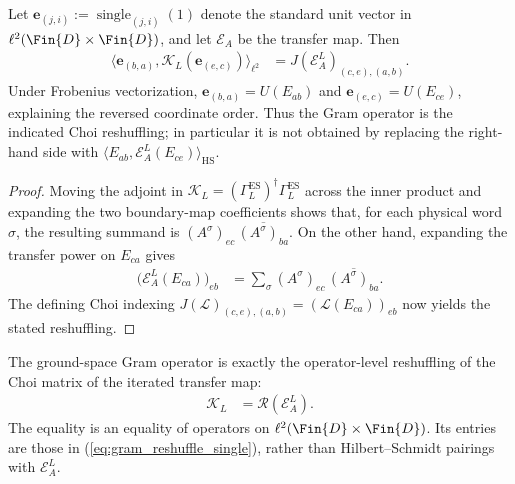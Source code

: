 \begin{lemma}
    \label{thm:ground_space_gram_choi_reshuffling}
    \leanok
    Let $\mathbf e_{(j,i)}:=\operatorname{single}_{(j,i)}(1)$ denote the
    standard unit vector in $\ell^2(\Fin{D}\times\Fin{D})$, and let
    $\mathcal E_A$ be the transfer map.  Then
    \begin{align}
        \bigl\langle \mathbf e_{(b,a)},
        \mathcal K_L(\mathbf e_{(e,c)})\bigr\rangle_{\ell^2}
         & =J(\mathcal E_A^L)_{(c,e),(a,b)}.
    \end{align}
    Under Frobenius vectorization, $\mathbf e_{(b,a)}=U(E_{ab})$ and
    $\mathbf e_{(e,c)}=U(E_{ce})$, explaining the reversed coordinate order.
    Thus the Gram operator is the indicated Choi reshuffling; in particular it
    is not obtained by replacing the right-hand side with
    $\langle E_{ab},\mathcal E_A^L(E_{ce})\rangle_{\mathrm{HS}}$.
\end{lemma}

\begin{proof}
    \leanok
    Moving the adjoint in
    $\mathcal K_L=(\Gamma_L^{\mathrm{ES}})^\dagger\Gamma_L^{\mathrm{ES}}$
    across the
    inner product and expanding the two boundary-map coefficients shows that,
    for each physical word $\sigma$, the resulting summand is
    $(A^\sigma)_{ec}\,\overline{(A^\sigma)_{ba}}$.  On the other hand,
    expanding the transfer power on $E_{ca}$ gives
    \begin{align}
        \bigl(\mathcal E_A^L(E_{ca})\bigr)_{eb}
         & =\sum_\sigma (A^\sigma)_{ec}\,
        \overline{(A^\sigma)_{ba}}.
    \end{align}
    The defining Choi indexing
    $J(\mathcal L)_{(c,e),(a,b)}=(\mathcal L(E_{ca}))_{eb}$ now yields the
    stated reshuffling.
\end{proof}

\begin{lemma}
    \label{thm:ground_space_gram_eq_gram_reshuffle}
    \leanok
    The ground-space Gram operator is exactly the operator-level reshuffling of
    the Choi matrix of the iterated transfer map:
    \begin{align}
        \mathcal K_L
         & =\mathscr R\!\left(\mathcal E_A^L\right).
        \label{eq:ground_space_gram_eq_gram_reshuffle}
    \end{align}
    The equality is an equality of operators on
    $\ell^2(\Fin{D}\times\Fin{D})$.  Its entries are those in
    (\ref{eq:gram_reshuffle_single}), rather than Hilbert--Schmidt pairings with
    $\mathcal E_A^L$.
\end{lemma}

